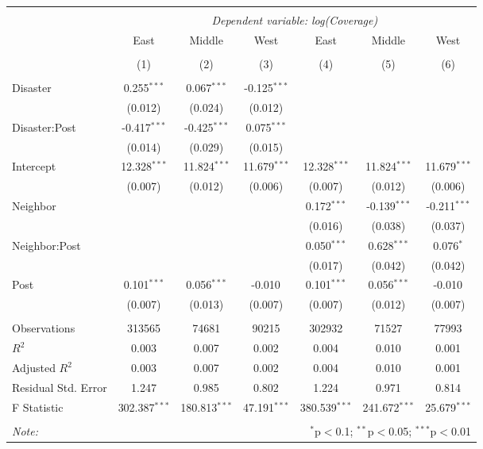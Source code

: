 
\begin{tabular}{@{\extracolsep{5pt}}lcccccc}
\\[-1.8ex]\hline
\hline \\[-1.8ex]
& \multicolumn{6}{c}{\textit{Dependent variable: log(Coverage)}} \
\cr \cline{2-7}
\\[-1.8ex] & \multicolumn{1}{c}{East} & \multicolumn{1}{c}{Middle} & \multicolumn{1}{c}{West} & \multicolumn{1}{c}{East} & \multicolumn{1}{c}{Middle} & \multicolumn{1}{c}{West}  \\
\\[-1.8ex] & (1) & (2) & (3) & (4) & (5) & (6) \\
\hline \\[-1.8ex]
 Disaster & 0.255$^{***}$ & 0.067$^{***}$ & -0.125$^{***}$ & & & \\
& (0.012) & (0.024) & (0.012) & & & \\
 Disaster:Post & -0.417$^{***}$ & -0.425$^{***}$ & 0.075$^{***}$ & & & \\
& (0.014) & (0.029) & (0.015) & & & \\
 Intercept & 12.328$^{***}$ & 11.824$^{***}$ & 11.679$^{***}$ & 12.328$^{***}$ & 11.824$^{***}$ & 11.679$^{***}$ \\
& (0.007) & (0.012) & (0.006) & (0.007) & (0.012) & (0.006) \\
 Neighbor & & & & 0.172$^{***}$ & -0.139$^{***}$ & -0.211$^{***}$ \\
& & & & (0.016) & (0.038) & (0.037) \\
 Neighbor:Post & & & & 0.050$^{***}$ & 0.628$^{***}$ & 0.076$^{*}$ \\
& & & & (0.017) & (0.042) & (0.042) \\
 Post & 0.101$^{***}$ & 0.056$^{***}$ & -0.010$^{}$ & 0.101$^{***}$ & 0.056$^{***}$ & -0.010$^{}$ \\
& (0.007) & (0.013) & (0.007) & (0.007) & (0.012) & (0.007) \\
\hline \\[-1.8ex]
 Observations & 313565 & 74681 & 90215 & 302932 & 71527 & 77993 \\
 $R^2$ & 0.003 & 0.007 & 0.002 & 0.004 & 0.010 & 0.001 \\
 Adjusted $R^2$ & 0.003 & 0.007 & 0.002 & 0.004 & 0.010 & 0.001 \\
 Residual Std. Error & 1.247  & 0.985  & 0.802  & 1.224  & 0.971  & 0.814  \\
 F Statistic & 302.387$^{***}$  & 180.813$^{***}$  & 47.191$^{***}$  & 380.539$^{***}$  & 241.672$^{***}$  & 25.679$^{***}$  \\
\hline
\hline \\[-1.8ex]
\textit{Note:} & \multicolumn{6}{r}{$^{*}$p$<$0.1; $^{**}$p$<$0.05; $^{***}$p$<$0.01} \\
\end{tabular}
